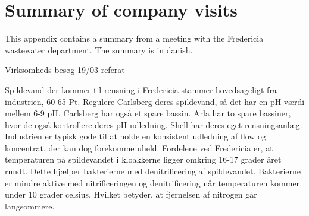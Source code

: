 \section{Summary of company visits}\label{app:resume}
This appendix contains a summary from a meeting with the Fredericia wastewater department. The summary is in danish. 

Virksomheds besøg 19/03 referat

Spildevand der kommer til rensning i Fredericia stammer hovedsageligt fra industrien, 60-65 %
Pt. Regulere Carlsberg deres spildevand, så det har en pH værdi mellem 6-9 pH. Carlsberg har også et spare bassin. Arla har to spare bassiner, hvor de også kontrollere deres pH udledning. Shell har deres eget rensningsanlæg.
Industrien er typisk gode til at holde en konsistent udledning af flow og koncentrat, der kan dog forekomme uheld. Fordelene ved Fredericia er, at temperaturen på spildevandet i kloakkerne ligger omkring 16-17 grader året rundt. Dette hjælper bakterierne med denitrificering af spildevandet. Bakterierne er mindre aktive med nitrificeringen og denitrificering når temperaturen kommer under 10 grader celsius. Hvilket betyder, at fjernelsen af nitrogen går langsommere. 
